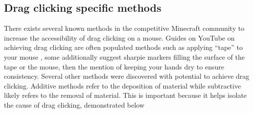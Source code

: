 \documentclass[12pt]{article}
\begin{document}
\subsection{Drag clicking specific methods}
There exists several known methods in the competitive Minecraft community to increase the accessibility of drag clicking on a mouse. Guides on YouTube on achieving drag clicking are often populated methods such as applying ``tape'' to your mouse \parencite{dernoze_dragclick}, some additionally suggest sharpie markers filling the surface of the tape or the mouse\parencite{dernoze_dragclick}, then the mention of keeping your hands dry to ensure consistency. Several other methods were discovered with potential to achieve drag clicking. Additive methods refer to the deposition of material while subtractive likely refers to the removal of material. This is important because it helps isolate the cause of drag clicking, demonstrated below 
\end{document}

